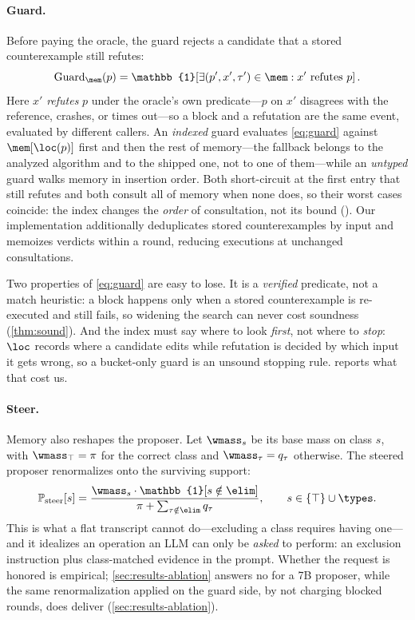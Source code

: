 \paragraph{Guard.}
Before paying the oracle, the guard rejects a candidate that a stored
counterexample still refutes:
\begin{equation}
\mathrm{Guard}_\mem(p) = \mathbb{1}\!\left[\exists (p', x', \tau') \in \mem :
x' \text{ refutes } p\right].
\label{eq:guard}
\end{equation}
Here $x'$ \emph{refutes} $p$ under the oracle's own predicate---$p$ on $x'$
disagrees with the reference, crashes, or times out---so a block and a
refutation are the same event, evaluated by different callers.
An \emph{indexed} guard evaluates \cref{eq:guard} against $\mem[\loc(p)]$ first
and then the rest of memory---the fallback belongs to the analyzed algorithm
and to the shipped one, not to one of them---while an \emph{untyped} guard
walks memory in insertion order. Both short-circuit at the first entry that still refutes and both
consult all of memory when none does, so their worst cases coincide: the index
changes the \emph{order} of consultation, not its bound (\Rguardcost). Our
implementation additionally deduplicates stored counterexamples by input and
memoizes verdicts within a round, reducing executions at unchanged
consultations.

Two properties of \cref{eq:guard} are easy to lose. It is a \emph{verified}
predicate, not a match heuristic: a block happens only when a stored
counterexample is re-executed and still fails, so widening the search can never
cost soundness (\cref{thm:sound}). And the index must say where to look
\emph{first}, not where to \emph{stop}: $\loc$ records where a candidate edits
while refutation is decided by which input it gets wrong, so a bucket-only
guard is an unsound stopping rule.  reports what that cost us.

\paragraph{Steer.}
Memory also reshapes the proposer. Let $\wmass_s$ be its base mass on class
$s$, with $\wmass_\top = \pi$ for the correct class and $\wmass_\tau = q_\tau$
otherwise. The steered proposer renormalizes onto the surviving support:
\begin{equation}
\mathbb{P}_{\mathrm{steer}}[s] =
\frac{\wmass_s \cdot \mathbb{1}[s \notin \elim]}
     {\pi + \sum_{\tau \notin \elim} q_\tau},
\qquad s \in \{\top\} \cup \types .
\label{eq:steer}
\end{equation}
This is what a flat transcript cannot do---excluding a class requires having
one---and it idealizes an operation an LLM can only be \emph{asked} to perform:
an exclusion instruction plus class-matched evidence in the prompt. Whether the
request is honored is empirical;
\cref{sec:results-ablation} answers no for a 7B proposer, while the same
renormalization applied on the guard side, by not charging blocked rounds, does
deliver (\cref{sec:results-ablation}).

